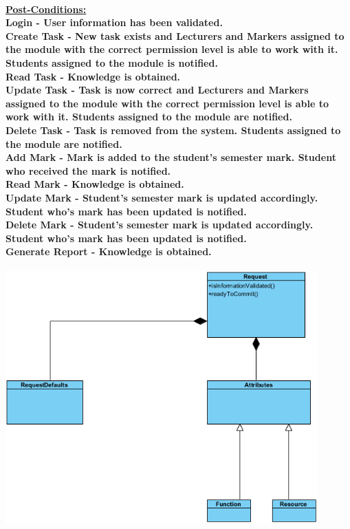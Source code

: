 \documentclass[12pt]{article}
\begin{document}
 \paragraph*{\underline{Post-Conditions:} \\ \textbf{Login} - User information has been validated.
 \\ \textbf{Create Task} - New task exists and Lecturers and Markers assigned to the module with the correct permission level is able to work with it. Students assigned to the module is notified.
 \\ \textbf{Read Task} - Knowledge is obtained.
 \\ \textbf{Update Task} - Task is now correct and Lecturers and Markers assigned to the module with the correct permission level is able to work with it. Students assigned to the module are notified.
 \\ \textbf{Delete Task} - Task is removed from the system. Students assigned to the module are notified.
 \\ \textbf{Add Mark} - Mark is added to the student's semester mark. Student who received the mark is notified.
 \\ \textbf{Read Mark} - Knowledge is obtained.
 \\ \textbf{Update Mark} - Student's semester mark is updated accordingly. Student who's mark has been updated is notified.
 \\ \textbf{Delete Mark} - Student's semester mark is updated accordingly. Student who's mark has been updated is notified.
 \\ \textbf{Generate Report} - Knowledge is obtained.}
 \begin{center}
  \includegraphics[width=120mm]{Diagram1.png}  
  \end{center}
\end{document}
